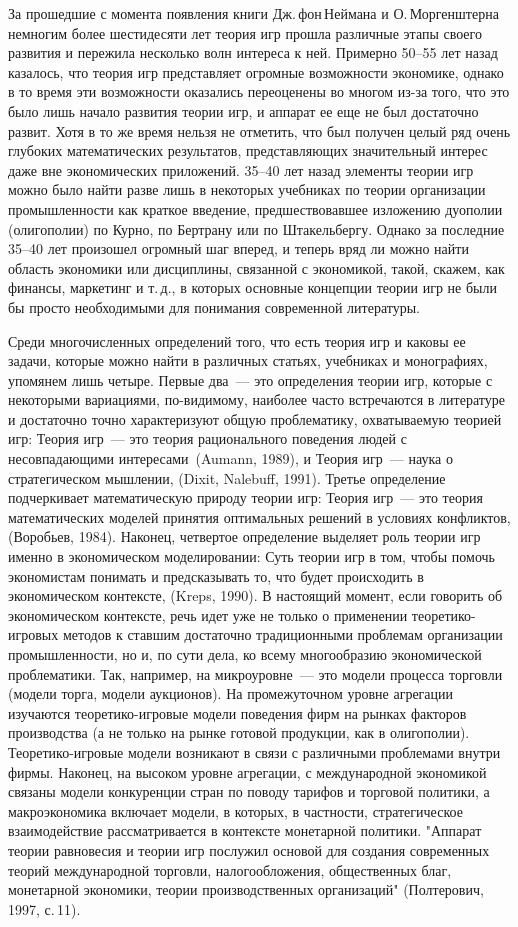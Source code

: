 \documentclass[12pt]{article}
\begin{document}
За прошедшие с момента появления книги Дж.\,фон\,Неймана и
О.\,Моргенштерна немногим более шестидесяти лет теория игр прошла
различные этапы своего развития и пережила несколько волн интереса к
ней.  Примерно 50--55 лет назад казалось, что теория игр представляет
огромные возможности экономике, однако в то время эти возможности
оказались переоценены во многом из-за того, что это было лишь начало
развития теории игр, и аппарат ее еще не был достаточно развит.
Хотя в то же время нельзя не отметить, что был
получен целый ряд очень глубоких математических результатов,
представляющих значительный интерес даже вне экономических
приложений. 35--40 лет назад элементы теории игр\, можно было найти разве
лишь в некоторых учебниках по теории
организации промышленности как краткое введение, предшествовавшее
изложению дуополии (олигополии) по
Курно, по Бертрану или по Штакельбергу. Однако за последние 35--40
лет произошел огромный шаг вперед, и теперь вряд ли можно найти
область экономики или дисциплины, связанной с экономикой, такой,
скажем, как финансы, маркетинг и т.\,д., в которых основные
концепции теории игр не были бы просто необходимыми для понимания
современной литературы.

Среди многочисленных определений того, что есть теория игр и каковы
ее задачи, которые можно найти в различных статьях, учебниках и
монографиях, упомянем лишь четыре. Первые два~--- это определения
теории игр, которые с некоторыми вариациями, по-видимому, наиболее
часто встречаются в литературе и достаточно точно характеризуют
общую проблематику, охватываемую теорией игр: Теория игр~--- это
теория рационального поведения людей с несовпадающими интересами\,
(Aumann, 1989), и Теория игр~--- наука о стратегическом мышлении,
(Di\-xit, Na\-le\-buff, 1991). Третье определение подчеркивает математическую
природу теории игр: Теория игр~--- это теория математических моделей
принятия оптимальных решений в условиях конфликтов, (Во\-ро\-бьев,
1984). Наконец, четвертое определение выделяет роль теории игр
именно в экономическом моделировании:  Суть теории игр в том, чтобы
помочь экономистам понимать и предсказывать то, что будет
происходить в экономическом контексте, (Kreps, 1990).  В настоящий
момент, если говорить об экономическом контексте, речь идет уже не
только о применении теоретико-игровых методов к ставшим достаточно
традиционными проблемам организации промышленности, но и, по сути
дела, ко всему многообразию экономической проблематики. Так,
например, на микроуровне~--- это модели процесса торговли (модели
торга, модели аукционов). На промежуточном уровне агрегации
изучаются теоретико-игровые модели поведения фирм на рынках факторов
производства (а не только на рынке готовой продукции, как в
олигополии).  Теоретико-игровые модели возникают в связи с
различными проблемами внутри фирмы.  Наконец, на высоком уровне
агрегации, с международной экономикой связаны модели конкуренции
стран по поводу тарифов и торговой политики, а макроэкономика
включает модели, в которых, в частности, стратегическое
взаимодействие рассматривается в контексте монетарной политики.
"Аппарат теории равновесия и теории игр послужил основой для создания
современных теорий международной торговли, налогообложения,
общественных благ, монетарной экономики, теории производственных
организаций" (Полтерович, 1997, с.\,11).
\end{document}
